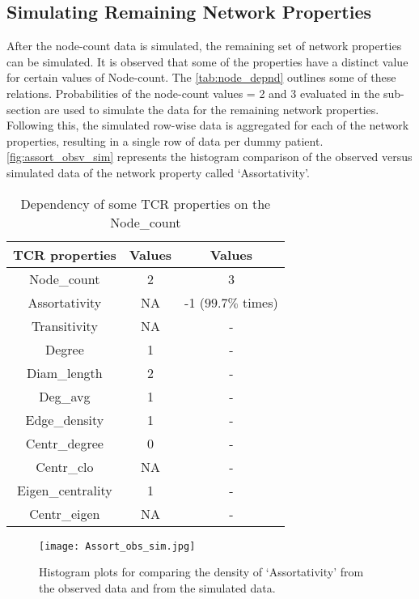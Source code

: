 \subsection{Simulating Remaining Network Properties} \label{subsubsection:sim_rem}
After the node-count data is simulated, the remaining set of network properties can be simulated. It is observed that some of the properties have a distinct value for certain values of Node-count. The \autoref{tab:node_depnd} outlines some of these relations. Probabilities of the node-count values = 2 and 3 evaluated in the  sub-section are used to simulate the data for the remaining network properties. Following this, the simulated row-wise data is aggregated for each of the network properties, resulting in a single row of data per dummy patient. \autoref{fig:assort_obsv_sim} represents the histogram comparison of the observed versus simulated data of the network property called \lq Assortativity'.\par
\begin{table}[H]\centering
\caption{Dependency of some TCR properties on the Node\_count}
\begin{tabular}{|c|c|c|}\hline
\cellcolor[HTML]{D9E1F2}\textbf{TCR properties} & \cellcolor[HTML]{D9E1F2}\textbf{Values}  & \cellcolor[HTML]{D9E1F2}\textbf{Values} \\ \hline
\cellcolor[HTML]{EAEAEA}Node\_count  & \cellcolor[HTML]{EAEAEA}2 & \cellcolor[HTML]{EAEAEA}3 \\ \hline
Assortativity  & NA & -1 ($99.7\%$ times) \\ 
Transitivity  & NA & - \\ 
Degree  & 1 & - \\ 
Diam\_length  & 2 & - \\
Deg\_avg  & 1 & - \\ 
Edge\_density  & 1 & - \\ 
Centr\_degree  & 0 &  -\\ 
Centr\_clo  & NA & - \\ 
Eigen\_centrality  & 1 & - \\ 
Centr\_eigen  & NA & -\\ \hline
\end{tabular}
\label{tab:node_depnd}
\end{table}
\begin{figure}[H]
\centering
\texttt{[image: Assort\_obs\_sim.jpg]}
\caption{Histogram plots for comparing the density of \lq Assortativity' from the observed data and from the simulated data.}
\label{fig:assort_obsv_sim}
\end{figure}

